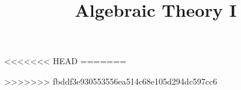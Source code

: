 \documentclass[a4paper]{article}
\title{Algebraic Theory I}
\begin{document}
    \maketitle
    \tableofcontents
    
    
    
    
    
    
    
    
    
    
    
    
    
    
    
    
    
    
    
    
    
    
    
    
    
    
    
    
    
    
    
    
<<<<<<< HEAD
=======
    
    
>>>>>>> fbddf3e930553556ea514c68e105d294dc597cc6
\end{document}
